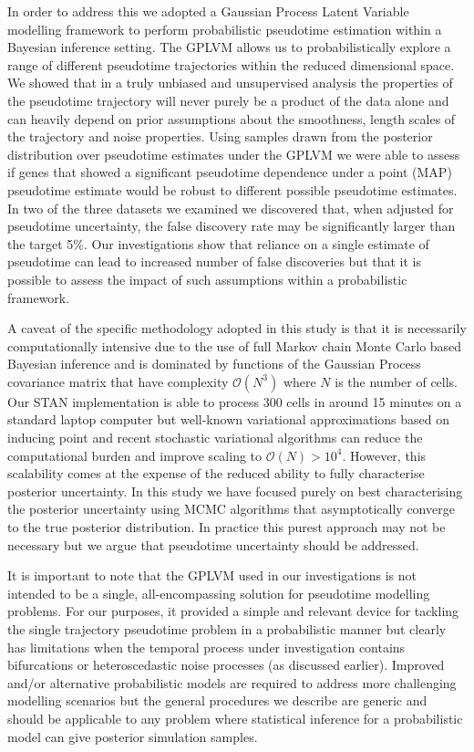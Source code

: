 In order to address this we adopted a Gaussian Process Latent Variable modelling framework to perform probabilistic pseudotime estimation within a Bayesian inference setting. The GPLVM allows us to probabilistically explore a range of different pseudotime trajectories within the reduced dimensional space. We showed that in a truly unbiased and unsupervised analysis the properties of the pseudotime trajectory will never purely be a product of the data alone and can heavily depend on prior assumptions about the smoothness, length scales of the trajectory and noise properties. Using  samples drawn from the posterior distribution over pseudotime estimates under the GPLVM we were able to assess if genes that showed a significant pseudotime dependence under a point (MAP) pseudotime estimate would be robust to different possible pseudotime estimates. In two of the three datasets we examined we discovered that, when adjusted for pseudotime uncertainty, the false discovery rate may be significantly larger than the target 5\%. Our investigations show that reliance on a single estimate of pseudotime can lead to increased number of false discoveries but that it is possible to assess the impact of such assumptions within a probabilistic framework.

A caveat of the specific methodology adopted in this study is that it is necessarily computationally intensive due to the use of full Markov chain Monte Carlo based Bayesian inference and is dominated by functions of the Gaussian Process covariance matrix that have complexity $\mathcal{O}(N^3)$ where $N$ is the number of cells. Our STAN implementation is able to process 300 cells in around 15 minutes on a standard laptop computer but well-known variational approximations based on inducing point \cite{titsias2009variational} and recent stochastic variational algorithms \cite{hensman2013gaussian} can reduce the computational burden and improve scaling to $\mathcal{O}(N) > 10^4$. However, this scalability comes at the expense of the reduced ability to fully characterise posterior uncertainty. In this study we have focused purely on best characterising the posterior uncertainty using MCMC algorithms that asymptotically converge to the true posterior distribution. In practice this purest approach may not be necessary but we argue that pseudotime uncertainty should be addressed.

It is important to note that the GPLVM used in our investigations is not intended to be a single, all-encompassing solution for pseudotime modelling problems. For our purposes, it provided a simple and relevant device for tackling the single trajectory pseudotime problem in a probabilistic manner but clearly has limitations when the temporal process under investigation contains bifurcations or heteroscedastic noise processes (as discussed earlier). Improved and/or alternative probabilistic models are required to address more challenging modelling scenarios but the general procedures we describe are generic and should be applicable to any problem where statistical inference for a probabilistic model can give posterior simulation samples.

